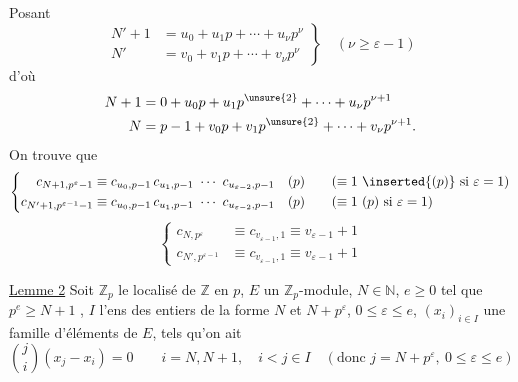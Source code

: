 Posant
\[
\left.\begin{aligned}
N'+1&=u_0+u_1p+\cdots+u_\nu p^\nu\\
N'&=v_0+v_1p+\cdots+v_\nu p^\nu
\end{aligned}\right\}\quad(\nu\geq\varepsilon-1)
\]
d'où
\[
\begin{aligned}
N+1&=0+u_0p+u_1p^{\unsure{2}}+\cdots+u_\nu p^{\nu+1}\\
N&=p-1+v_0p+v_1p^{\unsure{2}}+\cdots+v_\nu p^{\nu+1}.
\end{aligned}
\]
On trouve que
\[
\left\{\begin{aligned}
c_{N+1,p^\varepsilon-1}&\equiv c_{u_0,p-1}\,c_{u_1,p-1}\ \cdots\ c_{u_{\varepsilon-2},p-1}\quad(p)\qquad(\equiv1\ \inserted{(p)}\ \text{si }\varepsilon=1)\\
c_{N'+1,p^{\varepsilon-1}-1}&\equiv c_{u_0,p-1}\,c_{u_1,p-1}\ \cdots\ c_{u_{\varepsilon-2},p-1}\quad(p)\qquad(\equiv1\ (p)\ \text{si }\varepsilon=1)
\end{aligned}\right.
\]
\[
\left\{\begin{aligned}
c_{N,p^\varepsilon}&\equiv c_{v_{\varepsilon-1},1}\equiv v_{\varepsilon-1}+1\\
c_{N',p^{\varepsilon-1}}&\equiv c_{v_{\varepsilon-1},1}\equiv v_{\varepsilon-1}+1
\end{aligned}\right.
\]

\uline{Lemme 2} Soit $\mathbb{Z}_p$ le localisé de $\mathbb{Z}$ en $p$, $E$ un $\mathbb{Z}_p$-module, $N\in\mathbb{N}$, $e\geq0$ tel que $p^e\geq N+1$ , $I$ l'ens des entiers de la forme $N$ et $N+p^\varepsilon$, $0\leq\varepsilon\leq e$, $(x_i)_{i\in I}$ une famille d'éléments de $E$, tels qu'on ait
\[
\binom{j}{i}(x_j-x_i)=0\qquad i=N,N+1,\quad i<j\in I\quad(\text{donc }j=N+p^\varepsilon,\ 0\leq\varepsilon\leq e)
\]

